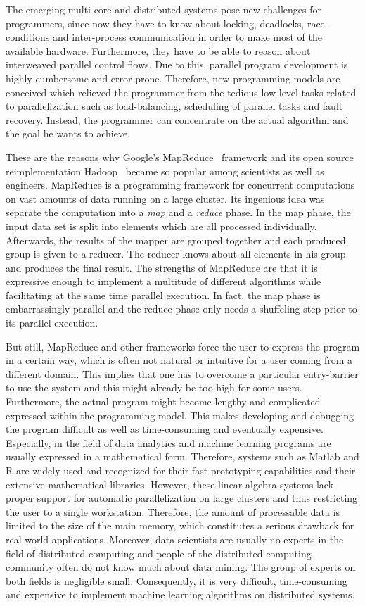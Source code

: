 The emerging multi-core and distributed systems pose new challenges for programmers, since now they have to know about locking, deadlocks, race-conditions and inter-process communication in order to make most of the available hardware.
Furthermore, they have to be able to reason about interweaved parallel control flows.
Due to this, parallel program development is highly cumbersome and error-prone.
Therefore, new programming models are conceived which relieved the programmer from the tedious low-level tasks related to parallelization such as load-balancing, scheduling of parallel tasks and fault recovery.
Instead, the programmer can concentrate on the actual algorithm and the goal he wants to achieve.

These are the reasons why Google's MapReduce~\cite{dean:c2008a} framework and its open source reimplementation Hadoop~\cite{hadoop:2008a} became so popular among scientists as well as engineers.
MapReduce is a programming framework for concurrent computations on vast amounts of data running on a large cluster.
Its ingenious idea was separate the computation into a \emph{map} and a \emph{reduce} phase.
In the map phase, the input data set is split into elements which are all processed individually.
Afterwards, the results of the mapper are grouped together and each produced group is given to a reducer.
The reducer knows about all elements in his group and produces the final result.
The strengths of MapReduce are that it is expressive enough to implement a multitude of different algorithms while facilitating at the same time parallel execution.
In fact, the map phase is embarrassingly parallel and the reduce phase only needs a shuffeling step prior to its parallel execution.

But still, MapReduce and other frameworks force the user to express the program in a certain way, which is often not natural or intuitive for a user coming from a different domain.
This implies that one has to overcome a particular entry-barrier to use the system and this might already be too high for some users.
Furthermore, the actual program might become lengthy and complicated expressed within the programming model.
This makes developing and debugging the program difficult as well as time-consuming and eventually expensive.
Especially, in the field of data analytics and machine learning programs are usually expressed in a mathematical form.
Therefore, systems such as Matlab and R are widely used and recognized for their fast prototyping capabilities and their extensive mathematical libraries.
However, these linear algebra systems lack proper support for automatic parallelization on large clusters and thus restricting the user to a single workstation.
Therefore, the amount of processable data is limited to the size of the main memory, which constitutes a serious drawback for real-world applications.
Moreover, data scientists are usually no experts in the field of distributed computing and people of the distributed computing community often do not know much about data mining.
The group of experts on both fields is negligible small.
Consequently, it is very difficult, time-consuming and expensive to implement machine learning algorithms on distributed systems.

